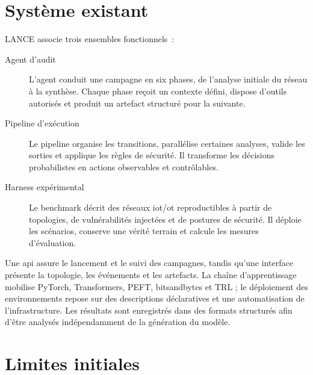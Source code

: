 \section{Système existant}

LANCE associe trois ensembles fonctionnels~:

\begin{description}
  \item[Agent d'audit] L'agent conduit une campagne en six phases, de l'analyse
  initiale du réseau à la synthèse. Chaque phase reçoit un contexte défini,
  dispose d'outils autorisés et produit un artefact structuré pour la suivante.

  \item[Pipeline d'exécution] Le pipeline organise les transitions, parallélise
  certaines analyses, valide les sorties et applique les règles de sécurité.
  Il transforme les décisions probabilistes en actions observables et
  contrôlables.

  \item[Harness expérimental] Le benchmark décrit des réseaux
  \gls{iot}/\gls{ot} reproductibles à partir de topologies, de vulnérabilités
  injectées et de postures de sécurité. Il déploie les scénarios, conserve une
  vérité terrain et calcule les mesures d'évaluation.
\end{description}

Une \gls{api} assure le lancement et le suivi des campagnes, tandis qu'une
interface présente la topologie, les événements et les artefacts. La chaîne
d'apprentissage mobilise PyTorch, Transformers, PEFT, bitsandbytes et TRL ; le
déploiement des environnements repose sur des descriptions déclaratives et une
automatisation de l'infrastructure. Les résultats sont enregistrés dans des
formats structurés afin d'être analysés indépendamment de la génération du
modèle.

\section{Limites initiales}

